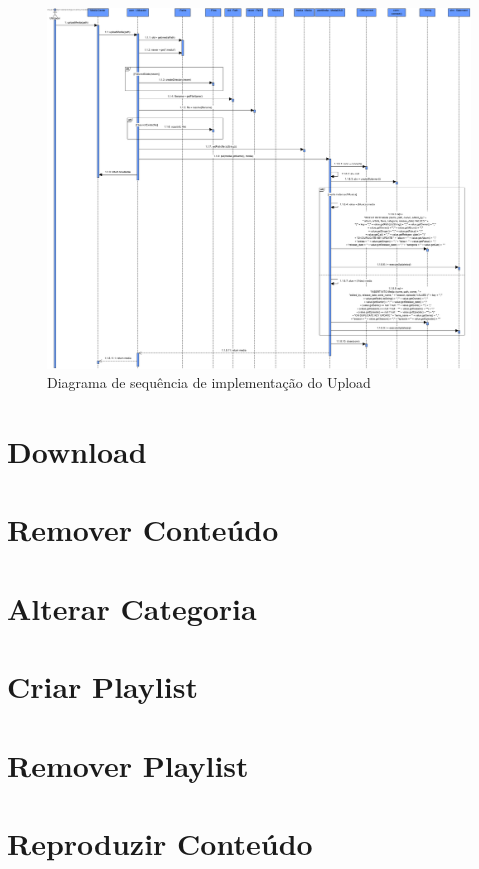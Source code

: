 \documentclass[a4paper]{report}
\begin{document}
\begin{figure}[H]
	\centering 
    \includegraphics[width=\textwidth]{images/uploadImp.png}  
    \caption{Diagrama de sequência de implementação do Upload}
\end{figure}

\section{Download}

\section{Remover Conteúdo}

\section{Alterar Categoria}

\section{Criar Playlist}

\section{Remover Playlist}

\section{Reproduzir Conteúdo}
\end{document}

